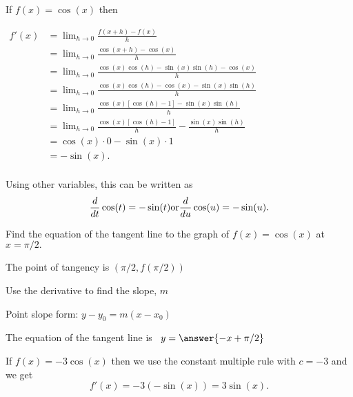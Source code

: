\documentclass{ximera}
\begin{document}
\begin{example} %
If $f(x) = \cos(x)$ then\\
\begin{center}
$\begin{aligned}
f'(x) &= \lim_{h \to 0} \frac{f(x+h)-f(x)}{h} \\[5pt]
&= \lim_{h \to 0} \frac{\cos(x+h) - \cos(x)}{h}\\[5pt]
&=  \lim_{h \to 0} \frac{\cos(x)\cos(h) - \sin(x)\sin(h) - \cos(x)}{h}\\[5pt]
&=  \lim_{h \to 0} \frac{\cos(x)\cos(h) - \cos(x) - \sin(x)\sin(h)}{h}\\[5pt]
&=  \lim_{h \to 0} \frac{\cos(x)[\cos(h) -1] - \sin(x)\sin(h)}{h}\\[5pt]
&=  \lim_{h \to 0} \frac{\cos(x)[\cos(h) -1]}{h} - \frac{\sin(x)\sin(h)}{h}\\[5pt]
&=   \cos(x) \cdot 0 - \sin(x)\cdot 1\\[5pt]
&= -\sin(x).\\[5pt]
\end{aligned}$
\end{center}
Using other variables, this can be written as
\[
\frac{d}{dt} \cos(t) = -\sin(t) \\
\text{or}\\
\frac{d}{du} \cos(u) = -\sin(u).
\]

\end{example}


\begin{problem} %
Find the equation of the tangent line to the graph of $f(x) = \cos(x)$ at $x=\pi/2.$


\begin{hint}
The point of tangency is $(\pi/2, f(\pi/2))$
\end{hint}
\begin{hint}
Use the derivative to find the slope, $m$
\end{hint}
\begin{hint}
Point slope form: $y-y_0 = m(x-x_0)$
\end{hint}

The equation of the tangent line is \ $y = \answer{-x + \pi/2}$

\end{problem}


\begin{example} %
 If $f(x) = -3\cos(x)$ then we use the constant multiple rule with $c = -3$ and we get 
\[
f'(x) = -3(-\sin(x)) = 3\sin(x).
\]
\end{example}
\end{document}
